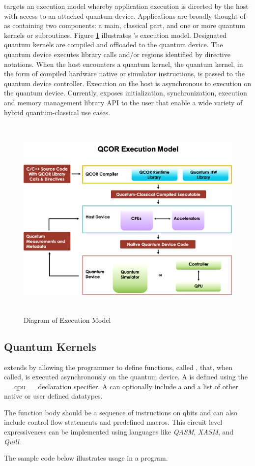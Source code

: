 \qcor targets an execution model whereby application execution is directed by the host with access to an attached quantum device. Applications are broadly thought of as containing two components: a main, classical part, and one or more quantum kernels or subroutines. Figure \ref{fig:exec_model} illustrates \qcor's execution model. Designated quantum kernels are compiled and offloaded to the quantum device. The quantum device executes \qcor library calls and/or \qcor regions identified by directive notations. When the host encounters a quantum kernel, the quantum kernel, in the form of compiled hardware native or simulator 
instructions, is passed to the quantum device controller. Execution on the host is asynchronous to execution on the quantum device. 
Currently, \qcor exposes initialization, synchronization, execution and memory management library \ac{API} to the user that enable a wide variety of hybrid quantum-classical use cases.

\begin{figure}
 \centering
 \includegraphics[width=5in,height=4in]{figures/Execution_Model_Illustration_v3.png}
  \caption{Diagram of \qcor Execution Model}
  \label{fig:exec_model}
\end{figure}


\subsection{\textbf{Quantum Kernels}}\label{subsec:kernel}
\qcor extends \CorCpp by allowing the programmer to define functions, called , that, when called, is executed asynchronously on the quantum device. A  is defined using the __qpu__ declaration specifier. A  can optionally include a \qcor {} and a list of other native or user defined \CorCpp datatypes.

The  function body should be a sequence of instructions on qbits and can also include control flow statements and predefined macros.  This circuit level expressiveness can be implemented using languages like \textit{QASM}, \textit{XASM}, and \textit{Quill}. 

The sample code below illustrates  usage in a \CorCpp program.
